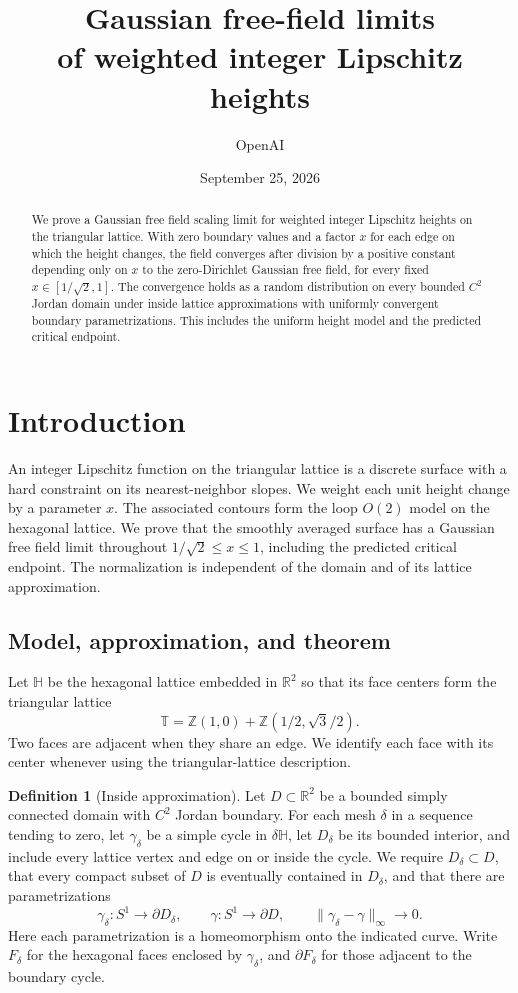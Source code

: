 \documentclass[11pt]{article}
\title{Gaussian free-field limits\\of weighted integer Lipschitz heights}
\author{OpenAI}
\date{September 25, 2026}
\newcommand{\T}{\mathbb T}
\newcommand{\hexlat}{\mathbb H}
\newcommand{\R}{\mathbb R}
\newcommand{\Z}{\mathbb Z}
\theoremstyle{definition}
\newtheorem{definition}[theorem]{Definition}
\theoremstyle{remark}
\numberwithin{equation}{section}
\begin{document}
\maketitle
\begin{abstract}
We prove a Gaussian free field scaling limit for weighted integer Lipschitz
heights on the triangular lattice. With zero boundary values and a factor $x$
for each edge on which the height changes, the field converges after division
by a positive constant depending only on $x$ to the zero-Dirichlet Gaussian
free field, for every fixed $x\in[1/\sqrt2,1]$. The convergence holds as a
random distribution on every bounded $C^2$ Jordan domain under inside lattice
approximations with uniformly convergent boundary parametrizations. This
includes the uniform height model and the predicted critical endpoint.
\end{abstract}

\tableofcontents

\section{Introduction}\label{sec:introduction}

An integer Lipschitz function on the triangular lattice is a discrete
surface with a hard constraint on its nearest-neighbor slopes.  We weight
each unit height change by a parameter $x$.  The associated contours form
the loop $O(2)$ model on the hexagonal lattice.  We prove that the smoothly
averaged surface has a Gaussian free field limit throughout
$1/\sqrt2\le x\le1$, including the predicted critical endpoint.  The
normalization is independent of the domain and of its lattice approximation.

\subsection{Model, approximation, and theorem}

Let $\hexlat$ be the hexagonal lattice embedded in $\R^2$ so that its face
centers form the triangular lattice
\[
 \T=\Z(1,0)+\Z(1/2,\sqrt3/2).
\]
Two faces are adjacent when they share an edge.  We identify each face with
its center whenever using the triangular-lattice description.

\begin{definition}[Inside approximation]\label{def:approximation}
Let $D\subset\R^2$ be a bounded simply connected domain with $C^2$ Jordan
boundary.  For each mesh $\delta$ in a sequence tending to zero, let
$\gamma_\delta$ be a simple cycle in $\delta\hexlat$, let $D_\delta$ be its
bounded interior, and include every lattice vertex and edge on or inside
the cycle.  We require $D_\delta\subset D$, that every compact subset of
$D$ is eventually contained in $D_\delta$, and that there are
parametrizations
\[
 \gamma_\delta:S^1\longrightarrow\partial D_\delta,
 \qquad \gamma:S^1\longrightarrow\partial D,
 \qquad \|\gamma_\delta-\gamma\|_\infty\longrightarrow0.
\]
Here each parametrization is a homeomorphism onto the indicated curve.
Write $F_\delta$ for the hexagonal faces enclosed by $\gamma_\delta$, and
$\partial F_\delta$ for those adjacent to the boundary cycle.
\end{definition}
\end{document}
